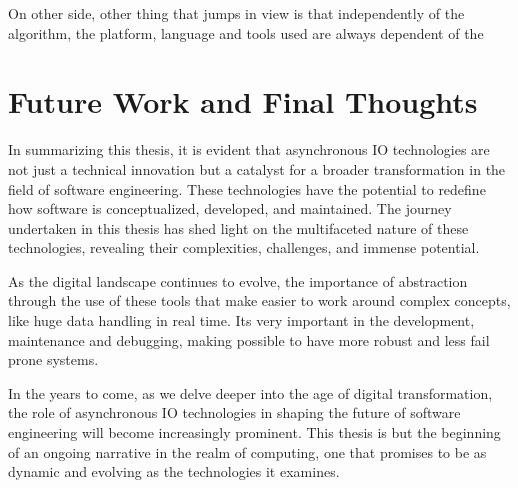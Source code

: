 On other side, other thing that jumps in view is that independently of the algorithm, the platform, language and tools used are always dependent of the 

\section{Future Work and Final Thoughts}
In summarizing this thesis, it is evident that asynchronous IO technologies are not just a technical innovation but a catalyst for a broader transformation in the field of software engineering. These technologies have the potential to redefine how software is conceptualized, developed, and maintained. The journey undertaken in this thesis has shed light on the multifaceted nature of these technologies, revealing their complexities, challenges, and immense potential.

As the digital landscape continues to evolve, the importance of abstraction through the use of these tools that make easier to work around complex concepts, like huge data handling in real time. Its very important in the development, maintenance and debugging, making possible to have more robust and less fail prone systems.

In the years to come, as we delve deeper into the age of digital transformation, the role of asynchronous IO technologies in shaping the future of software engineering will become increasingly prominent. This thesis is but the beginning of an ongoing narrative in the realm of computing, one that promises to be as dynamic and evolving as the technologies it examines.


